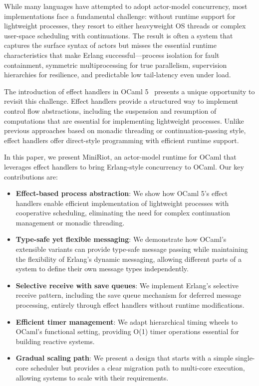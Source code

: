 \documentclass[sigplan,screen]{acmart}
\begin{document}
While many languages have attempted to adopt actor-model concurrency, most implementations face a fundamental challenge: without runtime support for lightweight processes, they resort to either heavyweight OS threads or complex user-space scheduling with continuations. The result is often a system that captures the surface syntax of actors but misses the essential runtime characteristics that make Erlang successful—process isolation for fault containment, symmetric multiprocessing for true parallelism, supervision hierarchies for resilience, and predictable low tail-latency even under load.

The introduction of effect handlers in OCaml 5~\cite{ocaml5effects} presents a unique opportunity to revisit this challenge. Effect handlers provide a structured way to implement control flow abstractions, including the suspension and resumption of computations that are essential for implementing lightweight processes. Unlike previous approaches based on monadic threading or continuation-passing style, effect handlers offer direct-style programming with efficient runtime support.

In this paper, we present MiniRiot, an actor-model runtime for OCaml that leverages effect handlers to bring Erlang-style concurrency to OCaml. Our key contributions are:

\begin{itemize}
\item \textbf{Effect-based process abstraction}: We show how OCaml 5's effect handlers enable efficient implementation of lightweight processes with cooperative scheduling, eliminating the need for complex continuation management or monadic threading.

\item \textbf{Type-safe yet flexible messaging}: We demonstrate how OCaml's extensible variants can provide type-safe message passing while maintaining the flexibility of Erlang's dynamic messaging, allowing different parts of a system to define their own message types independently.

\item \textbf{Selective receive with save queues}: We implement Erlang's selective receive pattern, including the save queue mechanism for deferred message processing, entirely through effect handlers without runtime modifications.

\item \textbf{Efficient timer management}: We adapt hierarchical timing wheels to OCaml's functional setting, providing O(1) timer operations essential for building reactive systems.

\item \textbf{Gradual scaling path}: We present a design that starts with a simple single-core scheduler but provides a clear migration path to multi-core execution, allowing systems to scale with their requirements.
\end{itemize}
\end{document}
